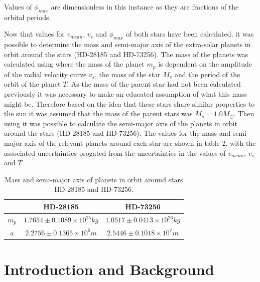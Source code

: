 \documentclass[]{article}
\begin{document}
Values of $\phi_{max}$ are dimensionless in this instance as they are
fractions of the orbital periods.
\par
Now that values for $v_{mean}$, $v_{s}$ and $\phi_{max}$ of both stars have 
been calculated, it was possible to determine the mass and semi-major axis of the
extra-solar planets in orbit around the stars (HD-28185 and HD-73256).
The mass of the planets was calculated using %
where the mass of the planet $m_p $ is dependent on the amplitude of the radial 
velocity curve $v_{s}$, the mass of the star $M_s$ and the period of the orbit of the planet $T$.
As the mass of the parent star had not been calculated previously it was necessary to
make an educated assumption of what this mass might be. Therefore based on the idea 
that these stars share similar properties to the sun it was assumed that the mass of
the parent stars was $M_s = 1.0M_{\odot}$. Then using %
it was possible to calculate the semi-major axis of the planets in orbit around the
stars (HD-28185 and HD-73256). The values for the mass and semi-major axis of the 
relevant planets around each star are shown in table 2, with the associated 
uncertainties progated from the uncertainties in the values of $v_{mean}$, $v_{s}$
and $T$.

\begin{table}[h!]
    \begin{center}
      \caption{Mass and semi-major axis of planets in orbit around stars HD-28185 and HD-73256.}
      \label{tab:table2}
      \begin{tabular}{c|c|c}
         & {HD-28185} & {HD-73256} \\
        \hline
        $m_p$ & $1.7654\pm0.1089\times10^{25}kg$ & $1.0517\pm0.0413\times10^{26}kg$ \\
        \hline
        $a$ & $2.2756\pm0.1365\times10^{6}m$ & $2.5446\pm0.1018\times10^{7}m$\\
        
      \end{tabular}
    \end{center}
  \end{table}
  \par
  


\newpage
\section*{Introduction and Background}
\end{document}
